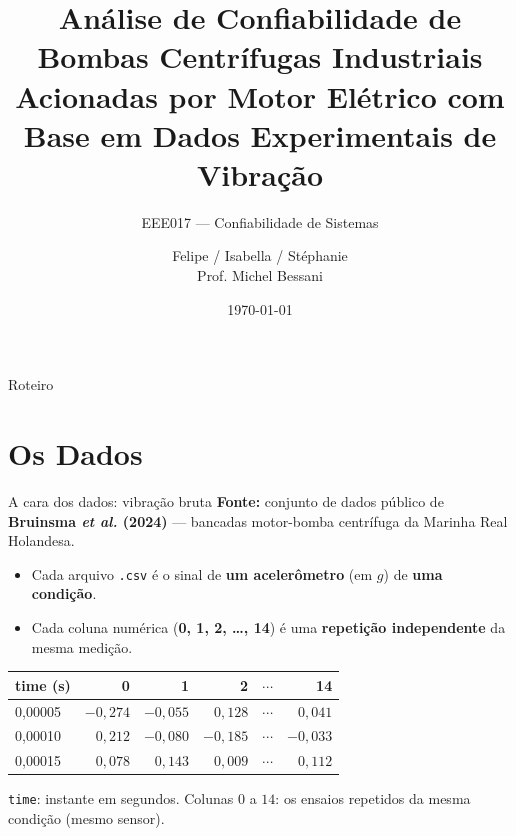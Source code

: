 \documentclass{beamer}
\title[Confiabilidade Motor-Bomba]{Análise de Confiabilidade de Bombas Centrífugas Industriais Acionadas por Motor Elétrico com Base em Dados Experimentais de Vibração}
\subtitle{EEE017 --- Confiabilidade de Sistemas}
\author[Felipe / Isabella / Stéphanie]{Felipe / Isabella / Stéphanie \\ {\footnotesize Prof. Michel Bessani}}
\institute[UFMG]{Universidade Federal de Minas Gerais}
\date{\today}
\begin{document}
\begin{frame}
    \titlepage
\end{frame}

\begin{frame}{Roteiro}
    \tableofcontents
\end{frame}

\section{Os Dados}

\begin{frame}{A cara dos dados: vibração bruta}
    \textbf{Fonte:} conjunto de dados público de \textbf{Bruinsma \textit{et al.} (2024)} --- bancadas motor-bomba centrífuga da Marinha Real Holandesa.
    \vspace{0.2cm}
    \begin{itemize}
        \item Cada arquivo \texttt{.csv} é o sinal de \textbf{um acelerômetro} (em $g$) de \textbf{uma condição}.
        \item Cada coluna numérica (\textbf{0, 1, 2, \ldots, 14}) é uma \textbf{repetição independente} da mesma medição.
    \end{itemize}
    \vspace{0.15cm}
    \footnotesize
    \begin{tabular}{lrrrcr}
        \toprule
        \textbf{time (s)} & \textbf{0} & \textbf{1} & \textbf{2} & $\cdots$ & \textbf{14} \\
        \midrule
        0,00005 & $-0{,}274$ & $-0{,}055$ & $0{,}128$ & $\cdots$ & $0{,}041$ \\
        0,00010 & $0{,}212$ & $-0{,}080$ & $-0{,}185$ & $\cdots$ & $-0{,}033$ \\
        0,00015 & $0{,}078$ & $0{,}143$ & $0{,}009$ & $\cdots$ & $0{,}112$ \\
        \bottomrule
    \end{tabular}
    \normalsize
    \vspace{0.2cm}
    \begin{block}{}
        \texttt{time}: instante em segundos. Colunas $0$ a $14$: os ensaios repetidos da mesma condição (mesmo sensor).
    \end{block}
\end{frame}
\end{document}
